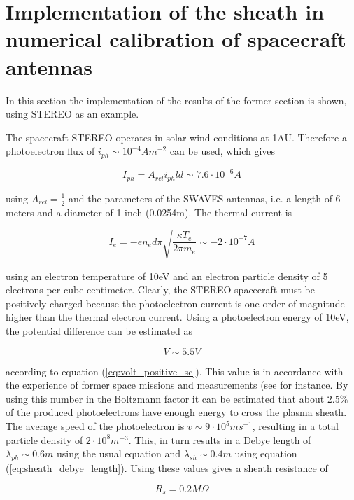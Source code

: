 \documentclass[a4paper,11pt]{thesis}
\begin{document}
\section{Implementation of the sheath in numerical calibration of spacecraft antennas}
In this section the implementation of the results of the former section is shown, using STEREO as an example.

The spacecraft STEREO operates in solar wind conditions at 1AU. Therefore a photoelectron flux of $i_{ph}\sim 10^{-4} Am^{-2}$ can be used, which gives

\begin{equation}
I_{ph}=A_{rel} i_{ph}ld\sim 7.6 \cdot 10^{-6}A
\end{equation}

using $A_{rel}=\frac{1}{2}$ and the parameters of the SWAVES antennas, i.e. a length of 6 meters and a diameter of 1 inch (0.0254m). The thermal current is

\begin{equation}
I_e=-en_e d\pi \sqrt{\frac{\kappa T_e}{2\pi m_e}}\sim -2\cdot 10^{-7}A
\end{equation}

using an electron temperature of 10eV and an electron particle density of 5 electrons per cube centimeter. Clearly, the STEREO spacecraft must be positively charged because the photoelectron current is one order of magnitude higher than the thermal electron current. Using a photoelectron energy of 10eV, the potential difference can be estimated as

\begin{equation}
    V\sim5.5V
\end{equation}

according to equation (\ref{eq:volt_positive_sc}). This value is in accordance with the experience of former space missions and measurements (see \cite{kellogg01} for instance. By using this number in the Boltzmann factor it can be estimated that about $2.5\%$ of the produced photoelectrons have enough energy to cross the plasma sheath. The average speed of the photoelectron is $\bar{v}\sim 9\cdot 10^5 ms^{-1}$, resulting in a total particle density of $2\cdot10^8m^{-3}$. This, in turn results in a Debye length of $\lambda_{ph}\sim0.6m$ using the usual equation and $\lambda_{sh}\sim0.4m$ using equation (\ref{eq:sheath_debye_length}). Using these values gives a sheath resistance of

\begin{equation}
    R_s=0.2M\Omega
\end{equation}
\end{document}
